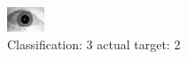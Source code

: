 \begin{figure}[h!]
\begin{center}
\includegraphics[width=0.60\columnwidth]{figures/ID1762_class_3_target_2.png}
\end{center}
\caption{ Classification: 3 actual target: 2}
\label{fig:ID1762_class_3_target_2}
\end{figure}
